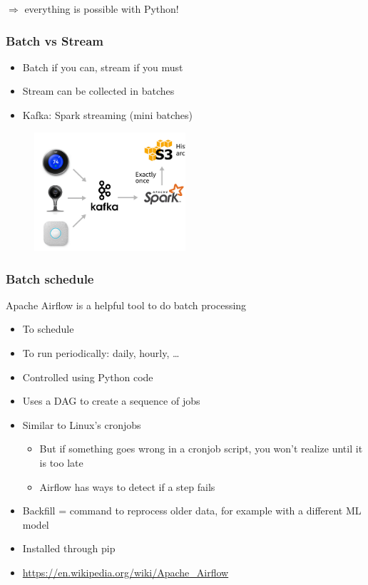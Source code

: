\documentclass{article}
\begin{document}
$\Rightarrow$ everything is possible with Python!

\subsubsection{Batch vs Stream}

\begin{itemize}
    \item Batch if you can, stream if you must
    \item Stream can be collected in batches
    \item Kafka: Spark streaming (mini batches)
\end{itemize}

\begin{figure}[H]
    \centering
    \includegraphics[width=0.5\textwidth]{batch-vs-stream-kafka-spark.png}
    \caption{}
\end{figure}

\subsubsection{Batch schedule}

Apache Airflow is a helpful tool to do batch processing

\begin{itemize}
    \item To schedule
    \item To run periodically: daily, hourly, \dots
    \item Controlled using Python code
    \item Uses a DAG to create a sequence of jobs
    \item Similar to Linux's cronjobs
    \begin{itemize}
        \item But if something goes wrong in a cronjob script, you won't realize until it is too late
        \item Airflow has ways to detect if a step fails
    \end{itemize}
    \item Backfill = command to reprocess older data, for example with a different ML model
    \item Installed through pip
    \item \url{https://en.wikipedia.org/wiki/Apache_Airflow}
\end{itemize}
\end{document}
